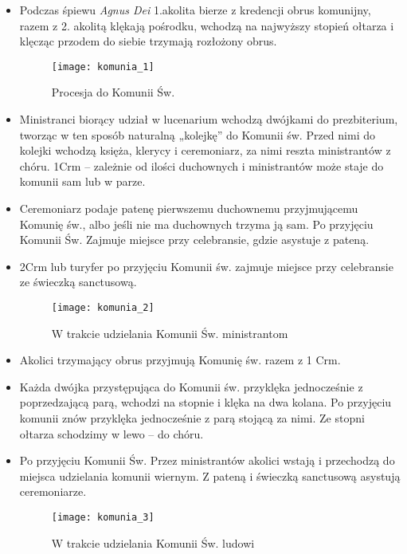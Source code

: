 			\begin{itemize}
				\item Podczas śpiewu \textit{Agnus Dei} 1.akolita bierze z kredencji obrus komunijny, razem z 2. akolitą klękają pośrodku, wchodzą na najwyższy stopień ołtarza i klęcząc przodem do siebie trzymają rozłożony obrus.
					\begin{figure}[h]
						\centering
						\texttt{[image: komunia\_1]}
						\caption{Procesja do Komunii Św.}
						\label{fig:komunia_1}
					\end{figure}
				\item Ministranci biorący udział w lucenarium wchodzą dwójkami do prezbiterium, tworząc w ten sposób naturalną „kolejkę” do Komunii św. Przed nimi do kolejki wchodzą księża, klerycy i ceremoniarz, za nimi reszta ministrantów z chóru. 1Crm – zależnie od ilości duchownych i ministrantów może staje do komunii sam lub w parze.
				\item Ceremoniarz podaje patenę pierwszemu duchownemu przyjmującemu Komunię św., albo jeśli nie ma duchownych trzyma ją sam. Po przyjęciu Komunii	Św. Zajmuje miejsce przy celebransie, gdzie asystuje z pateną.
				\item 2Crm lub turyfer po przyjęciu Komunii św. zajmuje miejsce przy celebransie ze świeczką sanctusową.
					\begin{figure}[h]
						\centering
						\texttt{[image: komunia\_2]}
						\caption{W trakcie udzielania Komunii Św. ministrantom}
						\label{fig:komunia_2}
					\end{figure}
				\item Akolici trzymający obrus przyjmują Komunię św. razem z 1 Crm.
				\item Każda dwójka przystępująca do Komunii św. przyklęka jednocześnie z poprzedzającą parą, wchodzi na stopnie i klęka na dwa kolana. Po przyjęciu komunii znów przyklęka jednocześnie z parą stojącą za nimi. Ze stopni ołtarza schodzimy w lewo – do chóru.
				\item Po przyjęciu Komunii Św. Przez ministrantów akolici wstają i przechodzą do miejsca udzielania komunii wiernym. Z pateną i świeczką sanctusową asystują ceremoniarze.
					\begin{figure}[h]
						\centering
						\texttt{[image: komunia\_3]}
						\caption{W trakcie udzielania Komunii Św. ludowi}
						\label{fig:komunia_3}
					\end{figure}
			\end{itemize}
		
